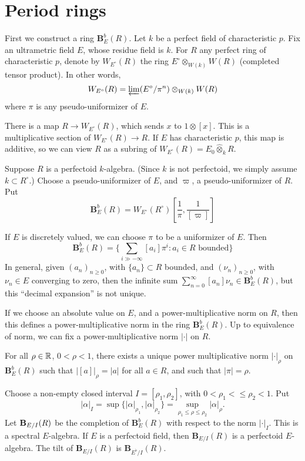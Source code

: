 \documentclass{article}
\begin{document}
\section{Period rings}

First we construct a ring $\mathbf B_E^b(R)$. Let $k$ be a perfect field of 
characteristic $p$. Fix an ultrametric field $E$, whose residue field is $k$. 
For $R$ any perfect ring of characteristic $p$, denote by $W_{E^\circ}(R)$ the 
ring $E^\circ\otimes_{W(k)} W(R)$ (completed tensor product). In other words, 
\[
  W_{E^\circ}(R) = \varprojlim (E^\circ/\pi^n)\otimes_{W(k)} W(R)
\]
where $\pi$ is any pseudo-uniformizer of $E$. 

There is a map $R\to W_{E^\circ}(R)$, which sends $x$ to 
$1\otimes [x]$. This is a multiplicative section of 
$W_{E^\circ}(R) \to R$. If $E$ has characteristic $p$, this map is additive, so 
we can view $R$ as a subring of $W_{E^\circ}(R) = E_0\hat\otimes_k R$. 

Suppose $R$ is a perfectoid $k$-algebra. (Since $k$ is not perfectoid, we simply 
assume $k\subset R^\circ$.) Choose a pseudo-uniformizer of $E$, and $\varpi$, 
a pseudo-uniformizer of $R$. Put 
\[
  \mathbf B_E^b(R) = W_{E^\circ}(R^\circ)[\frac 1 \pi,\frac{1}{[\varpi]}]
\]

If $E$ is discretely valued, we can choose $\pi$ to be a uniformizer of $E$. 
Then 
\[
  \mathbf B_E^b(R) = \{\sum_{i\gg -\infty} [a_i] \pi^i: a_i\in R\text{ bounded}\}
\]
In general, given $(a_n)_{n\geqslant 0}$, with $\{a_n\}\subset R$ bounded, and 
$(\nu_n)_{n\geqslant 0}$, with $\nu_n\in E$ converging to zero, then the infinite sum 
$\sum_{n=0}^\infty [a_n] \nu_n \in \mathbf B_E^b(R)$, but this ``decimal expansion'' 
is not unique. 

If we choose an absolute value on $E$, and a power-multiplicative norm on 
$R$, then this defines a power-multiplicative norm in the ring $\mathbf B_E^b(R)$. 
Up to equivalence of norm, we can fix a power-multiplicative norm $|\cdot |$ on 
$R$. 

\begin{proposition}
For all $\rho\in \mathbb{R}$, $0<\rho<1$, there exists a unique power multiplicative norm 
$|\cdot |_\rho$ on $\mathbf B_E^b(R)$ such that 
$|[a]|_\rho = |a|$ for all $a\in R$, and such that 
$|\pi|=\rho$. 
\end{proposition}

Choose a non-empty closed interval $I=[\rho_1,\rho_2]$, with 
$0<\rho_1<\leqslant \rho_2<1$. Put 
\[
  |\alpha|_I = \sup\{|\alpha|_{\rho_1},|\alpha|_{\rho_2}\} = \sup_{\rho_1\leqslant \rho\leqslant \rho_2} |\alpha|_\rho .
\]
Let $\mathbf{B}_{E/I}(R)$ be the completion of $\mathbf B_E^b(R)$ with respect to 
the norm $|\cdot |_I$. This is a spectral $E$-algebra. If $E$ is a perfectoid 
field, then $\mathbf B_{E/I}(R)$ is a perfectoid $E$-algebra. The tilt of 
$\mathbf B_{E/I}(R)$ is $\mathbf B_{E^\flat/I}(R)$. 
\end{document}

